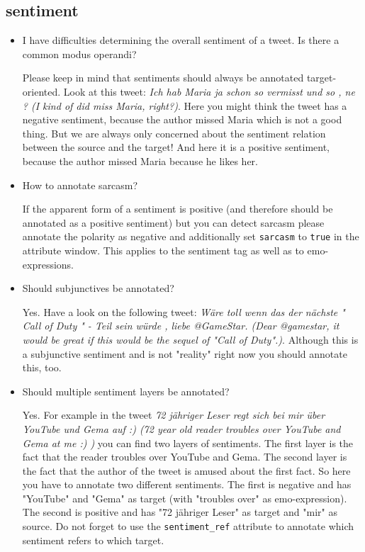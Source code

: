 \documentclass[11pt,a4paper]{article}
\begin{document}
\subsection{sentiment}
\begin{itemize}
\item I have difficulties determining the overall sentiment of a tweet.
Is there a common modus operandi?

Please keep in mind that sentiments should always be annotated
target-oriented. Look at this tweet: \textit{Ich hab Maria ja schon so
  vermisst und so , ne ? (I kind of did miss Maria, right?)}. Here you
might think the tweet has a negative sentiment, because the author
missed Maria which is not a good thing. But we are always only
concerned about the sentiment relation between the source and the
target! And here it is a positive sentiment, because the author missed
Maria because he likes her.

\item How to annotate sarcasm?

If the apparent form of a sentiment is positive (and therefore should
be annotated as a positive sentiment) but you can detect sarcasm
please annotate the polarity as negative and additionally set
\texttt{sarcasm} to \texttt{true} in the attribute window. This
applies to the sentiment tag as well as to emo-expressions.

\item Should subjunctives be annotated?

Yes. Have a look on the following tweet: \textit{W\"are toll wenn das
  der n\"achste " Call of Duty " - Teil sein w\"urde , liebe
  @GameStar. (Dear @gamestar, it would be great if this would be the
  sequel of "Call of Duty".)}. Although this is a subjunctive
sentiment and is not "reality" right now you should annotate this,
too.

\item Should multiple sentiment layers be annotated?

Yes. For example in the tweet \textit{72 j\"ahriger Leser regt sich
  bei mir \"uber YouTube und Gema auf :) (72 year old reader troubles
  over YouTube and Gema at me :) )} you can find two layers of
sentiments. The first layer is the fact that the reader troubles over
YouTube and Gema. The second layer is the fact that the author of the
tweet is amused about the first fact. So here you have to annotate two
different sentiments. The first is negative and has "YouTube" and
"Gema" as target (with "troubles over" as emo-expression). The second
is positive and has "72 jähriger Leser" as target and "mir" as
source. Do not forget to use the \texttt{sentiment\_ref} attribute to
annotate which sentiment refers to which target.
\end{itemize}
\end{document}
